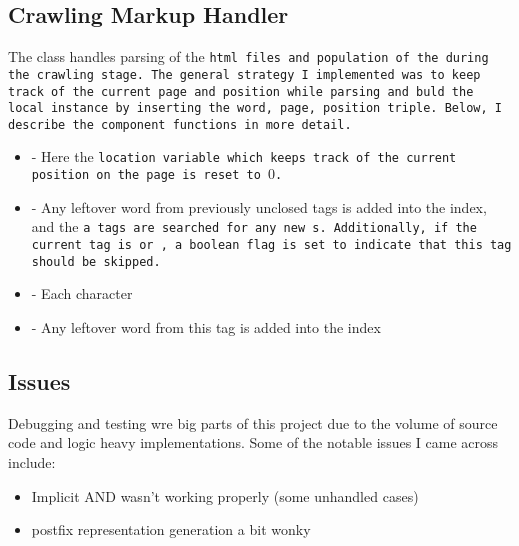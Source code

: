 \documentclass[11pt]{article}
\begin{document}
\subsection{Crawling Markup Handler}
The \CMH{} class handles parsing of the \tt{html} files and population of the \WI{} during the crawling stage. The general strategy I implemented was to keep track of the current page and position while parsing and buld the local \WI{} instance by inserting the word, page, position triple. Below, I describe the component functions in more detail.
\begin{itemize}
	\item \hds{} - Here the \tt{location} variable which keeps track of the current position on the page is reset to $0$. 
	\item \hoe{} - Any leftover word from previously unclosed tags is added into the index, and the \tt{a} tags are searched for any new \URL s. Additionally, if the current tag is \style{} or \script{} , a boolean flag is set to indicate that this tag should be skipped.
	\item  - Each character 
	\item \hce{} - Any leftover word from this tag is added into the index
\end{itemize}


\newpage
\subsection{Issues}
Debugging and testing wre big parts of this project due to the volume of source code and logic heavy implementations. Some of the notable issues I came across include:
\begin{itemize}
	\item Implicit AND wasn't working properly (some unhandled cases)
	\item postfix representation generation a bit wonky
\end{itemize}
\end{document}
